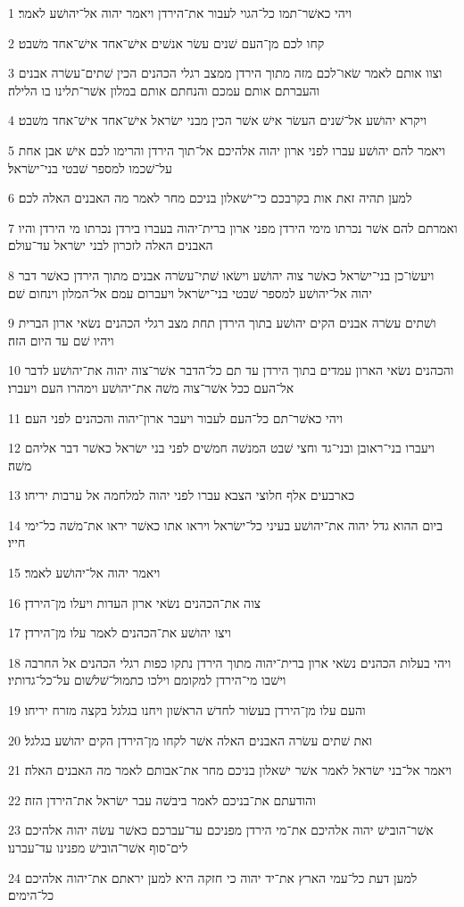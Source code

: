 \par 1 ויהי כאשׁר־תמו כל־הגוי לעבור את־הירדן ויאמר יהוה אל־יהושׁע לאמר׃
\par 2 קחו לכם מן־העם שׁנים עשׂר אנשׁים אישׁ־אחד אישׁ־אחד משׁבט׃
\par 3 וצוו אותם לאמר שׂאו־לכם מזה מתוך הירדן ממצב רגלי הכהנים הכין שׁתים־עשׂרה אבנים והעברתם אותם עמכם והנחתם אותם במלון אשׁר־תלינו בו הלילה׃
\par 4 ויקרא יהושׁע אל־שׁנים העשׂר אישׁ אשׁר הכין מבני ישׂראל אישׁ־אחד אישׁ־אחד משׁבט׃
\par 5 ויאמר להם יהושׁע עברו לפני ארון יהוה אלהיכם אל־תוך הירדן והרימו לכם אישׁ אבן אחת על־שׁכמו למספר שׁבטי בני־ישׂראל׃
\par 6 למען תהיה זאת אות בקרבכם כי־ישׁאלון בניכם מחר לאמר מה האבנים האלה לכם׃
\par 7 ואמרתם להם אשׁר נכרתו מימי הירדן מפני ארון ברית־יהוה בעברו בירדן נכרתו מי הירדן והיו האבנים האלה לזכרון לבני ישׂראל עד־עולם׃
\par 8 ויעשׂו־כן בני־ישׂראל כאשׁר צוה יהושׁע וישׂאו שׁתי־עשׂרה אבנים מתוך הירדן כאשׁר דבר יהוה אל־יהושׁע למספר שׁבטי בני־ישׂראל ויעברום עמם אל־המלון וינחום שׁם׃
\par 9 ושׁתים עשׂרה אבנים הקים יהושׁע בתוך הירדן תחת מצב רגלי הכהנים נשׂאי ארון הברית ויהיו שׁם עד היום הזה׃
\par 10 והכהנים נשׂאי הארון עמדים בתוך הירדן עד תם כל־הדבר אשׁר־צוה יהוה את־יהושׁע לדבר אל־העם ככל אשׁר־צוה משׁה את־יהושׁע וימהרו העם ויעברו׃
\par 11 ויהי כאשׁר־תם כל־העם לעבור ויעבר ארון־יהוה והכהנים לפני העם׃
\par 12 ויעברו בני־ראובן ובני־גד וחצי שׁבט המנשׁה חמשׁים לפני בני ישׂראל כאשׁר דבר אליהם משׁה׃
\par 13 כארבעים אלף חלוצי הצבא עברו לפני יהוה למלחמה אל ערבות יריחו׃
\par 14 ביום ההוא גדל יהוה את־יהושׁע בעיני כל־ישׂראל ויראו אתו כאשׁר יראו את־משׁה כל־ימי חייו׃
\par 15 ויאמר יהוה אל־יהושׁע לאמר׃
\par 16 צוה את־הכהנים נשׂאי ארון העדות ויעלו מן־הירדן׃
\par 17 ויצו יהושׁע את־הכהנים לאמר עלו מן־הירדן׃
\par 18 ויהי בעלות הכהנים נשׂאי ארון ברית־יהוה מתוך הירדן נתקו כפות רגלי הכהנים אל החרבה וישׁבו מי־הירדן למקומם וילכו כתמול־שׁלשׁום על־כל־גדותיו׃
\par 19 והעם עלו מן־הירדן בעשׂור לחדשׁ הראשׁון ויחנו בגלגל בקצה מזרח יריחו׃
\par 20 ואת שׁתים עשׂרה האבנים האלה אשׁר לקחו מן־הירדן הקים יהושׁע בגלגל׃
\par 21 ויאמר אל־בני ישׂראל לאמר אשׁר ישׁאלון בניכם מחר את־אבותם לאמר מה האבנים האלה׃
\par 22 והודעתם את־בניכם לאמר ביבשׁה עבר ישׂראל את־הירדן הזה׃
\par 23 אשׁר־הובישׁ יהוה אלהיכם את־מי הירדן מפניכם עד־עברכם כאשׁר עשׂה יהוה אלהיכם לים־סוף אשׁר־הובישׁ מפנינו עד־עברנו׃
\par 24 למען דעת כל־עמי הארץ את־יד יהוה כי חזקה היא למען יראתם את־יהוה אלהיכם כל־הימים׃

